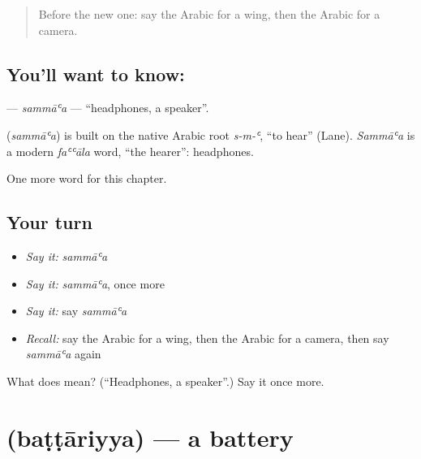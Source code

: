 \label{lesson:AR-C217-sammaa}



\begin{quote}
Before the new one: say the Arabic for a wing, then the Arabic for a camera.
\end{quote}

\subsection*{You'll want to know: }
\textbf{} — \emph{sammāʿa} — \textquotedblleft{}headphones, a speaker\textquotedblright{}.

\begin{cousinweb}
\textbf{} (\emph{sammāʿa}) is built on the native Arabic root \emph{s-m-ʿ}, \textquotedblleft{}to hear\textquotedblright{} (Lane). \emph{Sammāʿa} is a modern \emph{faʿʿāla} word, \textquotedblleft{}the hearer\textquotedblright{}: headphones.
\end{cousinweb}

\begin{grammarlens}[title={What you've built}]
One more word for this chapter.
\end{grammarlens}

\subsection*{Your turn}
\begin{itemize}
\raggedright
  \item \emph{Say it:} \emph{sammāʿa}
  \item \emph{Say it:} \emph{sammāʿa}, once more
  \item \emph{Say it:} say \emph{sammāʿa}
  \item \emph{Recall:} say the Arabic for a wing, then the Arabic for a camera, then say \emph{sammāʿa} again
\end{itemize}

\begin{tcolorbox}[breakable,colback=teal!4,colframe=teal!35!black,title={Before you move on}]
What does  mean? (\textquotedblleft{}Headphones, a speaker\textquotedblright{}.) Say it once more.
\end{tcolorbox}
\section[\texorpdfstring{\ar{بطارية} (baṭṭāriyya)}{بطارية (baṭṭāriyya)}]{ (baṭṭāriyya) — a battery}

